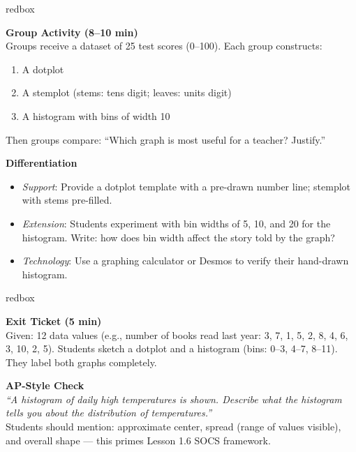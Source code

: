 \documentclass[10pt]{article}
\begin{document}
\begin{skillbox}{redbox}
\begin{minipage}[t]{0.48\linewidth}
    \textbf{Group Activity (8--10 min)}\\
    Groups receive a dataset of 25 test scores (0--100). Each group constructs:
    \begin{enumerate}
        \item A dotplot
        \item A stemplot (stems: tens digit; leaves: units digit)
        \item A histogram with bins of width 10
    \end{enumerate}
    Then groups compare: ``Which graph is most useful for a teacher? Justify.''
\end{minipage}
\hfill
\begin{minipage}[t]{0.48\linewidth}
    \textbf{Differentiation}
    \begin{itemize}
        \item \textit{Support}: Provide a dotplot template with a pre-drawn number line; stemplot with stems pre-filled.
        \item \textit{Extension}: Students experiment with bin widths of 5, 10, and 20 for the histogram. Write: how does bin width affect the story told by the graph?
        \item \textit{Technology}: Use a graphing calculator or Desmos to verify their hand-drawn histogram.
    \end{itemize}
\end{minipage}
\end{skillbox}

\begin{skillbox}{redbox}
\begin{minipage}[t]{0.48\linewidth}
    \textbf{Exit Ticket (5 min)}\\
    Given: 12 data values (e.g., number of books read last year: 3, 7, 1, 5, 2, 8, 4, 6, 3, 10, 2, 5). Students sketch a dotplot and a histogram (bins: 0--3, 4--7, 8--11). They label both graphs completely.
\end{minipage}
\hfill
\begin{minipage}[t]{0.48\linewidth}
    \textbf{AP-Style Check}\\
    \textit{``A histogram of daily high temperatures is shown. Describe what the histogram tells you about the distribution of temperatures.''} \\[4pt]
    Students should mention: approximate center, spread (range of values visible), and overall shape --- this primes Lesson 1.6 SOCS framework.
\end{minipage}
\end{skillbox}
\end{document}
